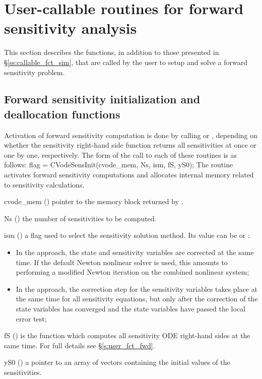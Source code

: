 \section{User-callable routines for forward sensitivity analysis}

This section describes the {\cvodes} functions, in addition to those presented
in \S\ref{ss:callable_fct_sim}, that are called by the user to setup and solve
a forward sensitivity problem.

\subsection{Forward sensitivity initialization and deallocation functions}
\label{ss:sensi_malloc}
Activation of forward sensitivity computation is done by calling
 or , depending on whether the sensitivity
right-hand side function returns all sensitivities at once or one by one, respectively.
The form of the call to each of these routines is as follows:
{
  flag = CVodeSensInit(cvode\_mem, Ns, ism, fS, yS0);
}
{
  The routine  activates forward sensitivity computations and
  allocates internal memory related to sensitivity calculations.
}
{
  \begin{args}

  \item[cvode\_mem] ()
    pointer to the {\cvodes} memory block returned by .

  \item[Ns] () 
    the number of sensitivities to be computed.
  \item[ism] ()
    a flag used to select the sensitivity solution method.  Its value can be
     or :
    \begin{itemize}
    \item In the  approach, the state and sensitivity
      variables are corrected at the same time. If the default Newton nonlinear
      solver is used, this amounts to performing a modified Newton iteration on
      the combined nonlinear system;
    \item In the  approach, the correction step for the sensitivity
      variables takes place at the same time for all sensitivity equations, but only after 
      the correction of the state variables has converged and the state variables 
      have passed the local error test; 
    \end{itemize}

  \item[fS] ()
    is the {\CC} function which computes all sensitivity ODE right-hand sides at the same time.
    For full details see \S\ref{s:user_fct_fwd}.
  \item[yS0] () 
    a pointer to an array of  vectors containing the initial 
    values of the sensitivities.

  \end{args}
}

